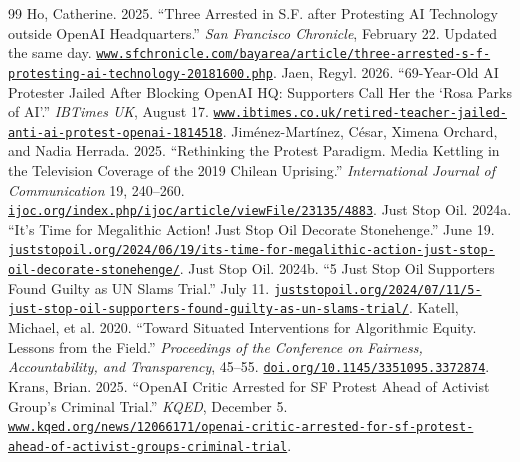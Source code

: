 \documentclass[11pt]{article}
\begin{document}
\begin{thebibliography}{99}
 Ho, Catherine. 2025. ``Three Arrested in S.F. after Protesting AI Technology outside OpenAI Headquarters.'' \emph{San Francisco Chronicle}, February 22. Updated the same day. \href{https://www.sfchronicle.com/bayarea/article/three-arrested-s-f-protesting-ai-technology-20181600.php}{\nolinkurl{www.sfchronicle.com/bayarea/article/three-arrested-s-f-protesting-ai-technology-20181600.php}}.
 Jaen, Regyl. 2026. ``69-Year-Old AI Protester Jailed After Blocking OpenAI HQ: Supporters Call Her the `Rosa Parks of AI'.'' \emph{IBTimes UK}, August 17. \href{https://www.ibtimes.co.uk/retired-teacher-jailed-anti-ai-protest-openai-1814518}{\nolinkurl{www.ibtimes.co.uk/retired-teacher-jailed-anti-ai-protest-openai-1814518}}.
 Jim\'enez-Mart\'inez, C\'esar, Ximena Orchard, and Nadia Herrada. 2025. ``Rethinking the Protest Paradigm. Media Kettling in the Television Coverage of the 2019 Chilean Uprising.'' \emph{International Journal of Communication} 19, 240--260. \href{https://ijoc.org/index.php/ijoc/article/viewFile/23135/4883}{\nolinkurl{ijoc.org/index.php/ijoc/article/viewFile/23135/4883}}.
 Just Stop Oil. 2024a. ``It's Time for Megalithic Action! Just Stop Oil Decorate Stonehenge.'' June 19. \href{https://juststopoil.org/2024/06/19/its-time-for-megalithic-action-just-stop-oil-decorate-stonehenge/}{\nolinkurl{juststopoil.org/2024/06/19/its-time-for-megalithic-action-just-stop-oil-decorate-stonehenge/}}.
 Just Stop Oil. 2024b. ``5 Just Stop Oil Supporters Found Guilty as UN Slams Trial.'' July 11. \href{https://juststopoil.org/2024/07/11/5-just-stop-oil-supporters-found-guilty-as-un-slams-trial/}{\nolinkurl{juststopoil.org/2024/07/11/5-just-stop-oil-supporters-found-guilty-as-un-slams-trial/}}.
 Katell, Michael, et al. 2020. ``Toward Situated Interventions for Algorithmic Equity. Lessons from the Field.'' \emph{Proceedings of the Conference on Fairness, Accountability, and Transparency}, 45--55. \href{https://doi.org/10.1145/3351095.3372874}{\nolinkurl{doi.org/10.1145/3351095.3372874}}.
 Krans, Brian. 2025. ``OpenAI Critic Arrested for SF Protest Ahead of Activist Group's Criminal Trial.'' \emph{KQED}, December 5. \href{https://www.kqed.org/news/12066171/openai-critic-arrested-for-sf-protest-ahead-of-activist-groups-criminal-trial}{\nolinkurl{www.kqed.org/news/12066171/openai-critic-arrested-for-sf-protest-ahead-of-activist-groups-criminal-trial}}.

\end{thebibliography}
\end{document}

